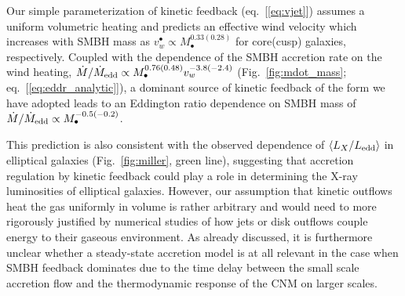 \documentclass[usenatbib,fleqn]{mn2e}
\begin{document}
Our simple parameterization of kinetic feedback (eq.~[\ref{eq:vjet}]) assumes a uniform volumetric heating and predicts an
effective wind velocity which increases with SMBH mass as
$v_{w}^{\bullet} \propto M_{\bullet}^{0.33(0.28)}$ for core(cusp)
galaxies, respectively.  Coupled with the dependence of the SMBH
accretion rate on the wind heating, $\dot{M}/\dot{M}_{\rm edd} \propto
M_{\bullet}^{0.76(0.48)}v_{w}^{-3.8(-2.4)}$ (Fig.~\ref{fig:mdot_mass};
eq.~[\ref{eq:eddr_analytic}]), a dominant source of kinetic feedback of the form we have
adopted leads to an Eddington ratio dependence on SMBH mass of
$\dot{M}/\dot{M}_{\rm edd} \propto M_{\bullet}^{-0.5(-0.2)}$.

This prediction is also consistent with the observed dependence of $\langle
L_{X}/L_{\rm edd} \rangle$ in elliptical galaxies
(Fig.~\ref{fig:miller}, green line), suggesting that accretion regulation
by kinetic feedback could play a role in determining the X-ray
luminosities of elliptical galaxies.  However, our assumption that
kinetic outflows heat the gas uniformly in volume is rather arbitrary and would need to more rigorously justified by numerical studies of how jets or disk outflows couple energy to their gaseous
environment.  As already discussed, it is furthermore unclear whether a steady-state accretion model is at all relevant in the case when SMBH feedback dominates due to the time delay between the small scale accretion flow and the thermodynamic response of the CNM on larger scales.  

\end{document}
